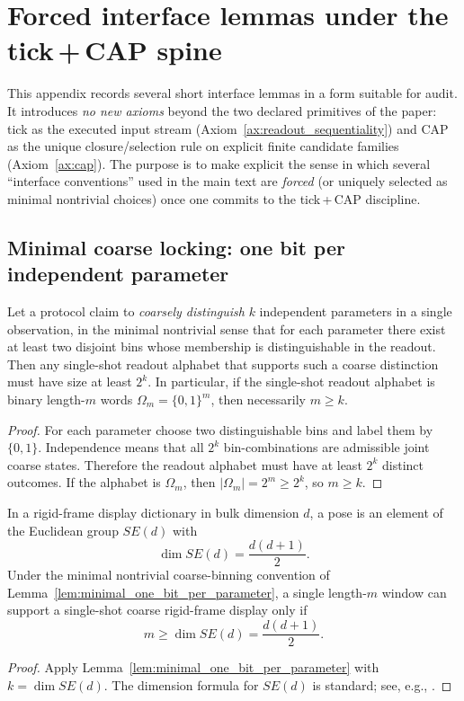 \section[Forced interface lemmas]{Forced interface lemmas under the \texorpdfstring{tick\,+\,CAP}{tick+CAP} spine}
\label{app:forced_interface_lemmas}

This appendix records several short interface lemmas in a form suitable for audit.
It introduces \emph{no new axioms} beyond the two declared primitives of the paper: tick as the executed input stream (Axiom~\ref{ax:readout_sequentiality}) and CAP as the unique closure/selection rule on explicit finite candidate families (Axiom~\ref{ax:cap}).
The purpose is to make explicit the sense in which several ``interface conventions'' used in the main text are \emph{forced} (or uniquely selected as minimal nontrivial choices) once one commits to the tick\,+\,CAP discipline.

\subsection{Minimal coarse locking: one bit per independent parameter}
\label{subsec:forced_minimal_coarse_lock}

\begin{lemma}
\label{lem:minimal_one_bit_per_parameter}
Let a protocol claim to \emph{coarsely distinguish} $k$ independent parameters in a single observation, in the minimal nontrivial sense that for each parameter there exist at least two disjoint bins whose membership is distinguishable in the readout.
Then any single-shot readout alphabet that supports such a coarse distinction must have size at least $2^k$.
In particular, if the single-shot readout alphabet is binary length-$m$ words $\Omega_m=\{0,1\}^m$, then necessarily $m\ge k$.
\end{lemma}
\begin{proof}
For each parameter choose two distinguishable bins and label them by $\{0,1\}$.
Independence means that all $2^k$ bin-combinations are admissible joint coarse states.
Therefore the readout alphabet must have at least $2^k$ distinct outcomes.
If the alphabet is $\Omega_m$, then $|\Omega_m|=2^m\ge 2^k$, so $m\ge k$.
\end{proof}

\begin{corollary}
\label{cor:forced_rigid_frame_budget}
In a rigid-frame display dictionary in bulk dimension $d$, a pose is an element of the Euclidean group $SE(d)$ with
\[
\dim SE(d)=\frac{d(d+1)}{2}.
\]
Under the minimal nontrivial coarse-binning convention of Lemma~\ref{lem:minimal_one_bit_per_parameter}, a single length-$m$ window can support a single-shot coarse rigid-frame display only if
\[
m\ge \dim SE(d)=\frac{d(d+1)}{2}.
\]
\end{corollary}
\begin{proof}
Apply Lemma~\ref{lem:minimal_one_bit_per_parameter} with $k=\dim SE(d)$.
The dimension formula for $SE(d)$ is standard; see, e.g., \cite{HallLieGroups2015}.
\end{proof}


